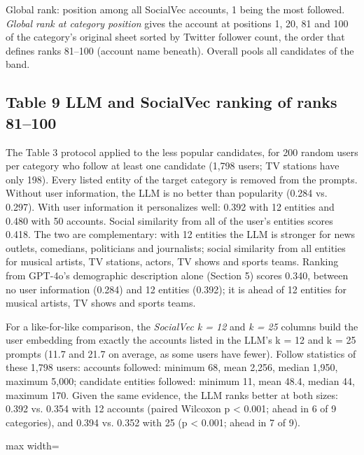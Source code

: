 \documentclass[10pt]{article}
\begin{document}
{\small Global rank: position among all SocialVec accounts, 1 being the most followed. \emph{Global rank at category position} gives the account at positions 1, 20, 81 and 100 of the category's original sheet sorted by Twitter follower count, the order that defines ranks 81--100 (account name beneath). Overall pools all candidates of the band.}

\subsection*{Table 9 \textperiodcentered{} LLM and SocialVec ranking of ranks 81--100}
The Table 3 protocol applied to the less popular candidates, for 200 random users per category who follow at least one candidate (1,798 users; TV stations have only 198). Every listed entity of the target category is removed from the prompts. Without user information, the LLM is no better than popularity (0.284 vs. 0.297). With user information it personalizes well: 0.392 with 12 entities and 0.480 with 50 accounts. Social similarity from all of the user's entities scores 0.418. The two are complementary: with 12 entities the LLM is stronger for news outlets, comedians, politicians and journalists; social similarity from all entities for musical artists, TV stations, actors, TV shows and sports teams. Ranking from GPT-4o's demographic description alone (Section 5) scores 0.340, between no user information (0.284) and 12 entities (0.392); it is ahead of 12 entities for musical artists, TV shows and sports teams.

For a like-for-like comparison, the \emph{SocialVec k = 12} and \emph{k = 25} columns build the user embedding from exactly the accounts listed in the LLM's k = 12 and k = 25 prompts (11.7 and 21.7 on average, as some users have fewer). Follow statistics of these 1,798 users: accounts followed: minimum 68, mean 2,256, median 1,950, maximum 5,000; candidate entities followed: minimum 11, mean 48.4, median 44, maximum 170. Given the same evidence, the LLM ranks better at both sizes: 0.392 vs. 0.354 with 12 accounts (paired Wilcoxon p \textless{} 0.001; ahead in 6 of 9 categories), and 0.394 vs. 0.352 with 25 (p \textless{} 0.001; ahead in 7 of 9).

\begin{center}\begin{adjustbox}{max width=\linewidth}

\end{adjustbox}\end{center}
\end{document}
